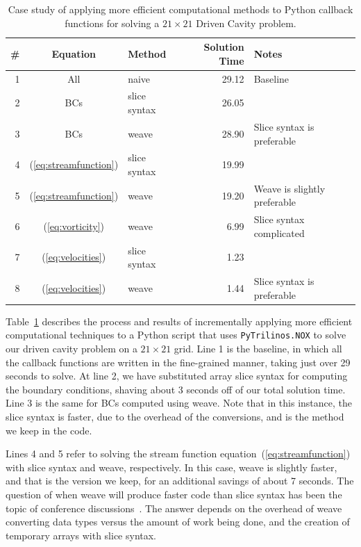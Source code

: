 \documentclass[acmtocl]{acmtrans2m}
\begin{document}
\begin{table}
  \begin{center}
    \begin{tabular}{|r|c|l|r|l|}
      \hline
      \# & Equation                 & Method       & Solution Time & Notes \\
      \hline
      1 & All                       & naive        & 29.12 & Baseline \\
      2 & BCs                       & slice syntax & 26.05 & \\
      3 & BCs                       & weave        & 28.90 & Slice syntax is preferable \\
      4 & (\ref{eq:streamfunction}) & slice syntax & 19.99 & \\
      5 & (\ref{eq:streamfunction}) & weave        & 19.20 & Weave is slightly preferable \\
      6 & (\ref{eq:vorticity})      & weave        &  6.99 & Slice syntax complicated \\
      7 & (\ref{eq:velocities})     & slice syntax &  1.23 & \\
      8 & (\ref{eq:velocities})     & weave        &  1.44 & Slice syntax is preferable \\
      \hline
    \end{tabular}
    \caption{Case study of applying more efficient computational
      methods to Python callback functions for solving a $21\times21$
      Driven Cavity problem.}
    \label{tab:callbacks}
  \end{center}
\end{table}

Table~\ref{tab:callbacks} describes the process and results of
incrementally applying more efficient computational techniques to a
Python script that uses {\tt PyTrilinos.NOX} to solve our driven
cavity problem on a $21\times21$ grid.  Line 1 is the baseline, in
which all the callback functions are written in the fine-grained
manner, taking just over 29 seconds to solve.  At line 2, we have
substituted array slice syntax for computing the boundary conditions,
shaving about 3 seconds off of our total solution time.  Line 3 is the
same for BCs computed using weave.  Note that in this instance, the
slice syntax is faster, due to the overhead of the conversions, and is
the method we keep in the code.

Lines 4 and 5 refer to solving the stream function
equation~(\ref{eq:streamfunction}) with slice syntax and weave,
respectively.  In this case, weave is slightly faster, and that is the
version we keep, for an additional savings of about 7 seconds.  The
question of when weave will produce faster code than slice syntax has
been the topic of conference discussions~\cite{Jones_Weave}.  The
answer depends on the overhead of weave converting data types versus
the amount of work being done, and the creation of temporary arrays
with slice syntax.
\end{document}
